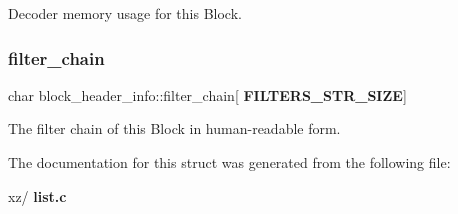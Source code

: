 Decoder memory usage for this Block. 

\mbox{\label{structblock__header__info_a57a8b7bfb8338109e1cbc294aa1fa537}} 
\subsubsection{filter\+\_\+chain}
{\footnotesize\ttfamily char block\+\_\+header\+\_\+info\+::filter\+\_\+chain[\textbf{ F\+I\+L\+T\+E\+R\+S\+\_\+\+S\+T\+R\+\_\+\+S\+I\+ZE}]}



The filter chain of this Block in human-\/readable form. 



The documentation for this struct was generated from the following file\+:\begin{DoxyCompactItemize}
\item 
xz/\textbf{ list.\+c}\end{DoxyCompactItemize}
